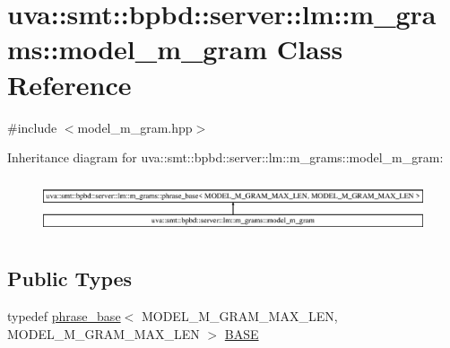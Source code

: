 \hypertarget{classuva_1_1smt_1_1bpbd_1_1server_1_1lm_1_1m__grams_1_1model__m__gram}{}\section{uva\+:\+:smt\+:\+:bpbd\+:\+:server\+:\+:lm\+:\+:m\+\_\+grams\+:\+:model\+\_\+m\+\_\+gram Class Reference}
\label{classuva_1_1smt_1_1bpbd_1_1server_1_1lm_1_1m__grams_1_1model__m__gram}


{\ttfamily \#include $<$model\+\_\+m\+\_\+gram.\+hpp$>$}

Inheritance diagram for uva\+:\+:smt\+:\+:bpbd\+:\+:server\+:\+:lm\+:\+:m\+\_\+grams\+:\+:model\+\_\+m\+\_\+gram\+:\begin{figure}[H]
\begin{center}
\leavevmode
\includegraphics[height=1.656805cm]{classuva_1_1smt_1_1bpbd_1_1server_1_1lm_1_1m__grams_1_1model__m__gram}
\end{center}
\end{figure}
\subsection*{Public Types}
\begin{DoxyCompactItemize}
\item 
typedef \hyperlink{classuva_1_1smt_1_1bpbd_1_1server_1_1lm_1_1m__grams_1_1phrase__base}{phrase\+\_\+base}$<$ M\+O\+D\+E\+L\+\_\+\+M\+\_\+\+G\+R\+A\+M\+\_\+\+M\+A\+X\+\_\+\+L\+E\+N, M\+O\+D\+E\+L\+\_\+\+M\+\_\+\+G\+R\+A\+M\+\_\+\+M\+A\+X\+\_\+\+L\+E\+N $>$ \hyperlink{classuva_1_1smt_1_1bpbd_1_1server_1_1lm_1_1m__grams_1_1model__m__gram_a4089a31decb5c2b1afe81e02043543c7}{B\+A\+S\+E}
\end{DoxyCompactItemize}
